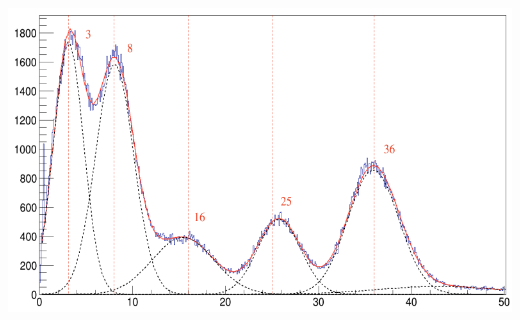 \documentclass[dvipsnames] {beamer}
\begin{document}
\begin{frame}
\begin{columns}[t]
\begin{block}{\bf {}}
      \includegraphics[width=1.\linewidth]{src_FragmentIdentif_2.png}
    \end{block}  
  \end{columns}
\end{frame}
\end{document}
